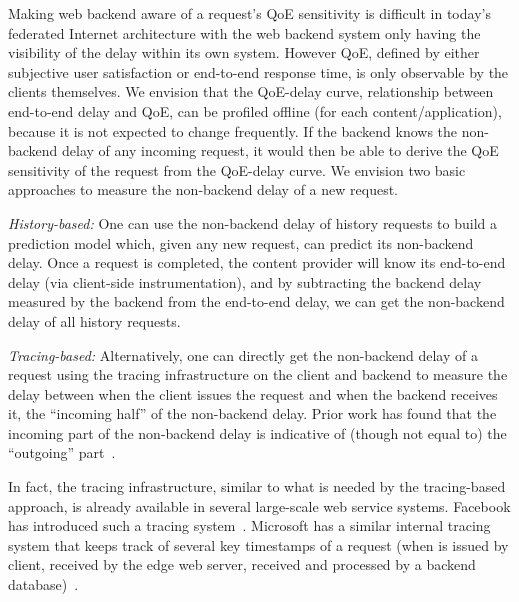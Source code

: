 Making web backend aware of a request's QoE sensitivity is difficult in today's federated Internet architecture with the web backend system only having the visibility of the delay within its own system. However QoE, defined by either subjective user satisfaction or end-to-end response time, is only observable by the clients themselves. 
We envision that the QoE-delay curve, \ie relationship between end-to-end delay and QoE, can be profiled offline (for each content/application), because it is not expected to change frequently.
If the backend knows the non-backend delay of any incoming request, it would then be able to derive the QoE sensitivity of the request from the QoE-delay curve. 
We envision two basic approaches to measure the non-backend delay of a new request. 
\begin{packeditemize}
\item {\em History-based:}
One can use the non-backend delay of history requests to build a prediction model which, given any new request, can predict its non-backend delay. Once a request is completed, the content provider will know its end-to-end delay (\eg via client-side instrumentation), and by  subtracting the backend delay measured by the backend from the end-to-end delay, we can get the non-backend delay of all history requests.

\item {\em Tracing-based:}
Alternatively, one can directly get the non-backend delay of a request using the tracing infrastructure on the client and backend to measure the delay between when the client issues the request and when the backend receives it, \ie the ``incoming half'' of the non-backend delay. Prior work has found that the incoming part of the non-backend delay is indicative of (though not equal to) the ``outgoing'' part~\cite{timecard}.
\end{packeditemize}


In fact, the tracing infrastructure, similar to what is needed by the tracing-based approach, is already available in several large-scale web service systems. Facebook has introduced such a tracing system~\cite{mystery}. Microsoft has a similar internal tracing system that keeps track of several key timestamps of a request (\eg when is issued by client, received by the edge web server, received and processed by a backend database)~\cite{lecuyer2017harvesting,odin}.

